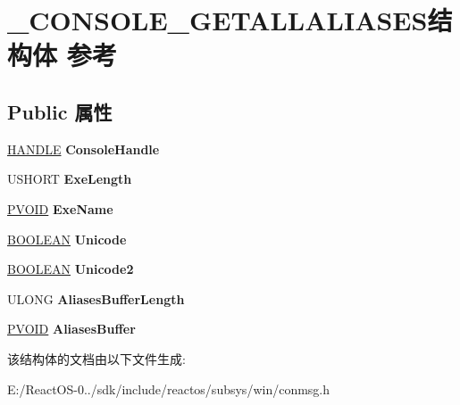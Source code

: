 \hypertarget{struct___c_o_n_s_o_l_e___g_e_t_a_l_l_a_l_i_a_s_e_s}{}\section{\+\_\+\+C\+O\+N\+S\+O\+L\+E\+\_\+\+G\+E\+T\+A\+L\+L\+A\+L\+I\+A\+S\+E\+S结构体 参考}
\label{struct___c_o_n_s_o_l_e___g_e_t_a_l_l_a_l_i_a_s_e_s}
\subsection*{Public 属性}
\begin{DoxyCompactItemize}
\item 
\mbox{\label{struct___c_o_n_s_o_l_e___g_e_t_a_l_l_a_l_i_a_s_e_s_ab1f80f3ece5fd2f1b75bfd11a1808e43}} 
\hyperlink{interfacevoid}{H\+A\+N\+D\+LE} {\bfseries Console\+Handle}
\item 
\mbox{\label{struct___c_o_n_s_o_l_e___g_e_t_a_l_l_a_l_i_a_s_e_s_a2cf6a69636bcbe3170c47548eb9e8c36}} 
U\+S\+H\+O\+RT {\bfseries Exe\+Length}
\item 
\mbox{\label{struct___c_o_n_s_o_l_e___g_e_t_a_l_l_a_l_i_a_s_e_s_a1eb7acf19a53c79a3851c783e3288c97}} 
\hyperlink{interfacevoid}{P\+V\+O\+ID} {\bfseries Exe\+Name}
\item 
\mbox{\label{struct___c_o_n_s_o_l_e___g_e_t_a_l_l_a_l_i_a_s_e_s_ae246676e8a32fd1aa1b2c73da930bd06}} 
\hyperlink{_processor_bind_8h_a112e3146cb38b6ee95e64d85842e380a}{B\+O\+O\+L\+E\+AN} {\bfseries Unicode}
\item 
\mbox{\label{struct___c_o_n_s_o_l_e___g_e_t_a_l_l_a_l_i_a_s_e_s_a96b9194837021538e0c759e540106023}} 
\hyperlink{_processor_bind_8h_a112e3146cb38b6ee95e64d85842e380a}{B\+O\+O\+L\+E\+AN} {\bfseries Unicode2}
\item 
\mbox{\label{struct___c_o_n_s_o_l_e___g_e_t_a_l_l_a_l_i_a_s_e_s_a00befcf71ee1ec8513f81f4a3790ccc3}} 
U\+L\+O\+NG {\bfseries Aliases\+Buffer\+Length}
\item 
\mbox{\label{struct___c_o_n_s_o_l_e___g_e_t_a_l_l_a_l_i_a_s_e_s_a63d2945e8eb79f8bb71faf92e7b50d6f}} 
\hyperlink{interfacevoid}{P\+V\+O\+ID} {\bfseries Aliases\+Buffer}
\end{DoxyCompactItemize}


该结构体的文档由以下文件生成\+:\begin{DoxyCompactItemize}
\item 
E\+:/\+React\+O\+S-\/0../sdk/include/reactos/subsys/win/conmsg.\+h\end{DoxyCompactItemize}
